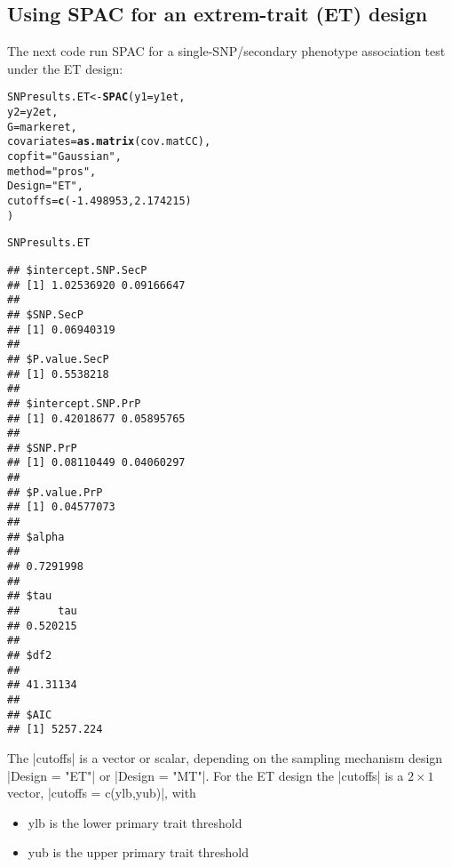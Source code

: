 \documentclass{article}\usepackage[]{graphicx}\usepackage[]{color}
\makeatletter
\newcommand{\hlnum}[1]{\textcolor[rgb]{0.686,0.059,0.569}{#1}}%
\newcommand{\hlstr}[1]{\textcolor[rgb]{0.192,0.494,0.8}{#1}}%
\newcommand{\hlopt}[1]{\textcolor[rgb]{0,0,0}{#1}}%
\newcommand{\hlstd}[1]{\textcolor[rgb]{0.345,0.345,0.345}{#1}}%
\newcommand{\hlkwb}[1]{\textcolor[rgb]{0.69,0.353,0.396}{#1}}%
\newcommand{\hlkwc}[1]{\textcolor[rgb]{0.333,0.667,0.333}{#1}}%
\newcommand{\hlkwd}[1]{\textcolor[rgb]{0.737,0.353,0.396}{\textbf{#1}}}%
\newenvironment{kframe}{%
 \def\at@end@of@kframe{}%
 \ifinner\ifhmode%
  \def\at@end@of@kframe{\end{minipage}}%
  \begin{minipage}{\columnwidth}%
 \fi\fi%
 \def\FrameCommand##1{\hskip\@totalleftmargin \hskip-\fboxsep
 \colorbox{shadecolor}{##1}\hskip-\fboxsep
     \hskip-\linewidth \hskip-\@totalleftmargin \hskip\columnwidth}%
 \MakeFramed {\advance\hsize-\width
   \@totalleftmargin\z@ \linewidth\hsize
   \@setminipage}}%
 {\par\unskip\endMakeFramed%
 \at@end@of@kframe}
\newenvironment{knitrout}{}{} %
\makeatother
\begin{document}
\subsection{Using SPAC for an extrem-trait (ET) design}
\label{sec:using-SPAC-ET}
The next code run SPAC for a single-SNP/secondary phenotype association test under the ET design:

\begin{knitrout}
\color{fgcolor}\begin{kframe}
\begin{alltt}
\hlstd{SNPresults.ET} \hlkwb{<-} \hlkwd{SPAC}\hlstd{(}\hlkwc{y1} \hlstd{= y1et,}
                   \hlkwc{y2} \hlstd{= y2et,}
                   \hlkwc{G} \hlstd{= markeret,}
                   \hlkwc{covariates} \hlstd{=} \hlkwd{as.matrix}\hlstd{(cov.matCC),}
                   \hlkwc{copfit} \hlstd{=} \hlstr{"Gaussian"}\hlstd{,}
                   \hlkwc{method} \hlstd{=} \hlstr{"pros"}\hlstd{,}
                   \hlkwc{Design} \hlstd{=} \hlstr{"ET"}\hlstd{,}
                   \hlkwc{cutoffs} \hlstd{=} \hlkwd{c}\hlstd{(}\hlopt{-}\hlnum{1.498953}\hlstd{,}\hlnum{2.174215}\hlstd{)}
                   \hlstd{)}
\end{alltt}


{\ttfamily\noindent\itshape\color{messagecolor}{\#\# Starting association analysis of the SNP...}}\begin{alltt}
\hlstd{SNPresults.ET}
\end{alltt}
\begin{verbatim}
## $intercept.SNP.SecP
## [1] 1.02536920 0.09166647
## 
## $SNP.SecP
## [1] 0.06940319
## 
## $P.value.SecP
## [1] 0.5538218
## 
## $intercept.SNP.PrP
## [1] 0.42018677 0.05895765
## 
## $SNP.PrP
## [1] 0.08110449 0.04060297
## 
## $P.value.PrP
## [1] 0.04577073
## 
## $alpha
##           
## 0.7291998 
## 
## $tau
##      tau 
## 0.520215 
## 
## $df2
##          
## 41.31134 
## 
## $AIC
## [1] 5257.224
\end{verbatim}
\end{kframe}
\end{knitrout}

The |cutoffs| is a vector or scalar, depending on the sampling mechanism design |Design = "ET"| or  |Design = "MT"|. For the ET design the |cutoffs| is a $2\times 1$ vector, |cutoffs = c(ylb,yub)|, with
\begin{itemize}
\item ylb is the lower primary trait threshold
\item yub is the upper primary trait threshold
\end{itemize}
\end{document}
